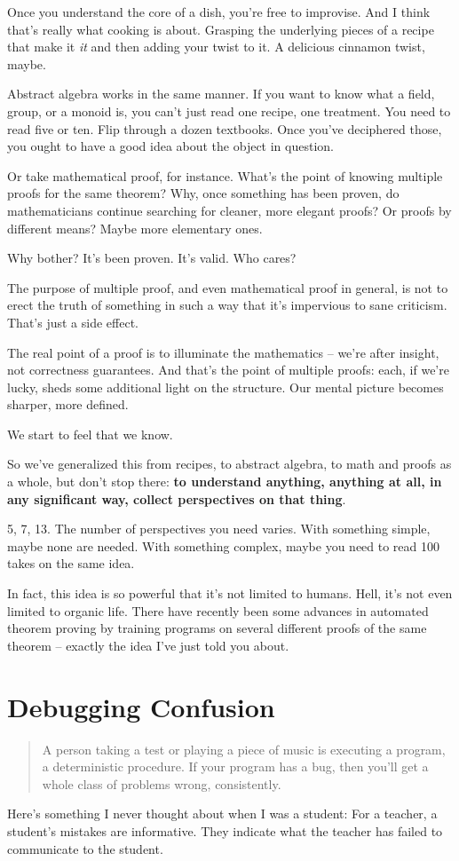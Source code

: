 Once you understand the core of a dish, you're free to improvise. And I think
that's really what cooking is about. Grasping the underlying pieces of a recipe
that make it \textit{it} and then adding your twist to it. A delicious cinnamon
twist, maybe.

Abstract algebra works in the same manner. If you want to know what a field,
group, or a monoid is, you can't just read one recipe, one treatment. You need
to read five or ten. Flip through a dozen textbooks. Once you've deciphered those, you ought to have a good
idea about the object in question.

Or take mathematical proof, for instance. What's the point of knowing multiple
proofs for the same theorem? Why, once something has been proven, do
mathematicians continue searching for cleaner, more elegant proofs? Or proofs by
different means? Maybe more elementary ones.

Why bother? It's been proven. It's valid. Who cares?

The purpose of multiple proof, and even mathematical proof in general, is not to
erect the truth of something in such a way that it's impervious to sane
criticism. That's just a side effect.

The real point of a proof is to illuminate the mathematics -- we're after
insight, not correctness guarantees. And that's the point of multiple proofs:
each, if we're lucky, sheds some additional light on the structure. Our mental
picture becomes sharper, more defined.

We start to feel that we know.

So we've generalized this from recipes, to abstract algebra, to math and proofs
as a whole, but don't stop there: \textbf{to understand anything, anything at all, in
  any significant way, collect perspectives on that thing}.

5, 7, 13. The number of perspectives you need varies. With something simple,
maybe none are needed. With something complex, maybe you need to read 100 takes
on the same idea.

In fact, this idea is so powerful that it's not limited to humans. Hell, it's
not even limited to organic life. There have recently been some advances in
automated theorem proving by training programs on several different proofs of
the same theorem -- exactly the idea I've just told you about.


\section{Debugging Confusion}
\begin{quote}
A person taking a test or playing a piece of music is executing a program, a
deterministic procedure.  If your program has a bug, then you'll get a whole
class of problems wrong, consistently.
\end{quote}

Here's something I never thought about when I was a student: For a teacher, a
student's mistakes are informative. They indicate what the teacher has failed to
communicate to the student.


